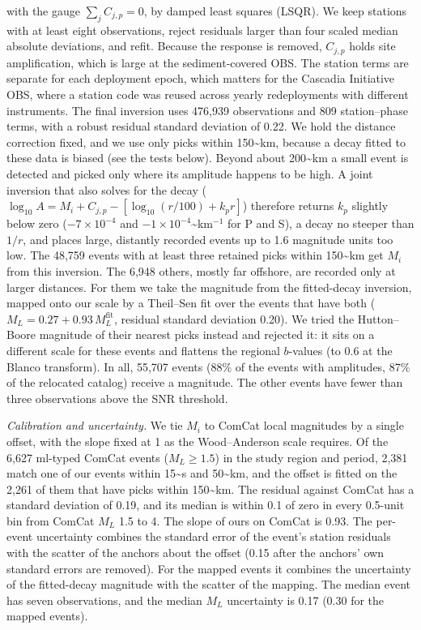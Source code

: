 \documentclass[review]{seismica}
\begin{document}
with the gauge \(\sum_j C_{j,p}=0\), by damped least squares (LSQR). We
keep stations with at least eight observations, reject residuals larger
than four scaled median absolute deviations, and refit. Because the
response is removed, \(C_{j,p}\) holds site amplification, which is
large at the sediment-covered OBS. The station terms are separate for
each deployment epoch, which matters for the Cascadia Initiative OBS,
where a station code was reused across yearly redeployments with
different instruments. The final inversion uses 476,939 observations and
809 station--phase terms, with a robust residual standard deviation of
0.22. We hold the distance correction fixed, and we use only picks
within 150\textasciitilde km, because a decay fitted to these data is
biased (see the tests below). Beyond about 200\textasciitilde km a small
event is detected and picked only where its amplitude happens to be
high. A joint inversion that also solves for the decay
(\(\log_{10}A = M_i + C_{j,p} - [\log_{10}(r/100) + k_p r]\)) therefore
returns \(k_p\) slightly below zero (\(-7\times10^{-4}\) and
\(-1\times10^{-4}\)\textasciitilde km\(^{-1}\) for P and S), a decay no
steeper than \(1/r\), and places large, distantly recorded events up to
1.6 magnitude units too low. The 48,759 events with at least three
retained picks within 150\textasciitilde km get \(M_i\) from this
inversion. The 6,948 others, mostly far offshore, are recorded only at
larger distances. For them we take the magnitude from the fitted-decay
inversion, mapped onto our scale by a Theil--Sen fit over the events
that have both (\(M_L = 0.27 + 0.93\,M_L^{\mathrm{fit}}\), residual
standard deviation 0.20). We tried the Hutton--Boore magnitude of their
nearest picks instead and rejected it: it sits on a different scale for
these events and flattens the regional \(b\)-values (to 0.6 at the
Blanco transform). In all, 55,707 events (88\% of the events with
amplitudes, 87\% of the relocated catalog) receive a magnitude. The
other events have fewer than three observations above the SNR threshold.

\emph{Calibration and uncertainty.} We tie \(M_i\) to ComCat local
magnitudes by a single offset, with the slope fixed at 1 as the
Wood--Anderson scale requires. Of the 6,627 ml-typed ComCat events
(\(M_L\ge1.5\)) in the study region and period, 2,381 match one of our
events within 15\textasciitilde s and 50\textasciitilde km, and the
offset is fitted on the 2,261 of them that have picks within
150\textasciitilde km. The residual against ComCat has a standard
deviation of 0.19, and its median is within 0.1 of zero in every
0.5-unit bin from ComCat \(M_L\) 1.5 to 4. The slope of ours on ComCat
is 0.93. The per-event uncertainty combines the standard error of the
event's station residuals with the scatter of the anchors about the
offset (0.15 after the anchors' own standard errors are removed). For
the mapped events it combines the uncertainty of the fitted-decay
magnitude with the scatter of the mapping. The median event has seven
observations, and the median \(M_L\) uncertainty is 0.17 (0.30 for the
mapped events).
\end{document}
